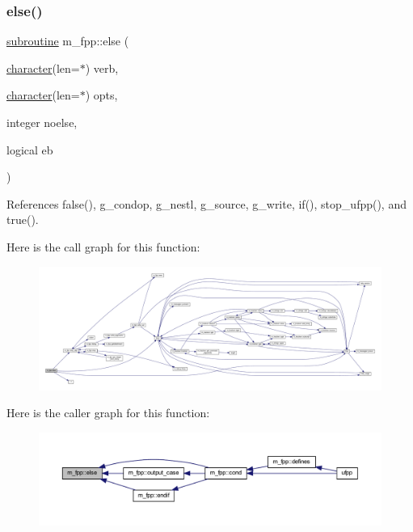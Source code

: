 \subsubsection{\texorpdfstring{else()}{else()}}
{\footnotesize\ttfamily \hyperlink{M__stopwatch_83_8txt_acfbcff50169d691ff02d4a123ed70482}{subroutine} m\+\_\+fpp\+::else (\begin{DoxyParamCaption}\item[{\hyperlink{option__stopwatch_83_8txt_abd4b21fbbd175834027b5224bfe97e66}{character}(len=$\ast$)}]{verb,  }\item[{\hyperlink{option__stopwatch_83_8txt_abd4b21fbbd175834027b5224bfe97e66}{character}(len=$\ast$)}]{opts,  }\item[{integer}]{noelse,  }\item[{logical}]{eb }\end{DoxyParamCaption})}



References false(), g\+\_\+condop, g\+\_\+nestl, g\+\_\+source, g\+\_\+write, if(), stop\+\_\+ufpp(), and true().

Here is the call graph for this function\+:
\nopagebreak
\begin{figure}[H]
\begin{center}
\leavevmode
\includegraphics[width=350pt]{namespacem__fpp_aa7ce8afa566111e9b6f86922b9ec3205_cgraph}
\end{center}
\end{figure}
Here is the caller graph for this function\+:
\nopagebreak
\begin{figure}[H]
\begin{center}
\leavevmode
\includegraphics[width=350pt]{namespacem__fpp_aa7ce8afa566111e9b6f86922b9ec3205_icgraph}
\end{center}
\end{figure}
\mbox{\label{namespacem__fpp_a943f646c7373dc0d88d4e6fe905fd90f}} 
